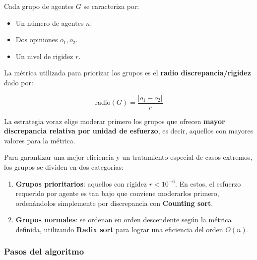 Cada grupo de agentes $G$ se caracteriza por:

\begin{itemize}
	\item Un número de agentes $n$.

	\item Dos opiniones $o_1, o_2$.

	\item Un nivel de rigidez $r$.
\end{itemize}

La métrica utilizada para priorizar los grupos es el \textbf{radio discrepancia/rigidez} dado por:

\begin{equation}
	\text{radio}(G) = \frac{ |o_1 - o_2| }{ r }
\end{equation}

La estrategia voraz elige moderar primero los grupos que ofrecen \textbf{mayor discrepancia relativa por unidad de esfuerzo}, es decir, aquellos con mayores valores para la métrica.

Para garantizar una mejor eficiencia y un tratamiento especial de casos extremos, los grupos se dividen en dos categorías:

\begin{enumerate}
	\item \textbf{Grupos prioritarios}: aquellos con rigidez $r < 10^{ -6 }$. En estos, el esfuerzo requerido por agente es tan bajo que conviene moderarlos primero, ordenándolos simplemente por discrepancia con \textbf{Counting sort}.

	\item \textbf{Grupos normales}: se ordenan en orden descendente según la métrica definida, utilizando \textbf{Radix sort} para lograr una eficiencia del orden $O(n)$.
\end{enumerate}

\subsubsection{Pasos del algoritmo}


